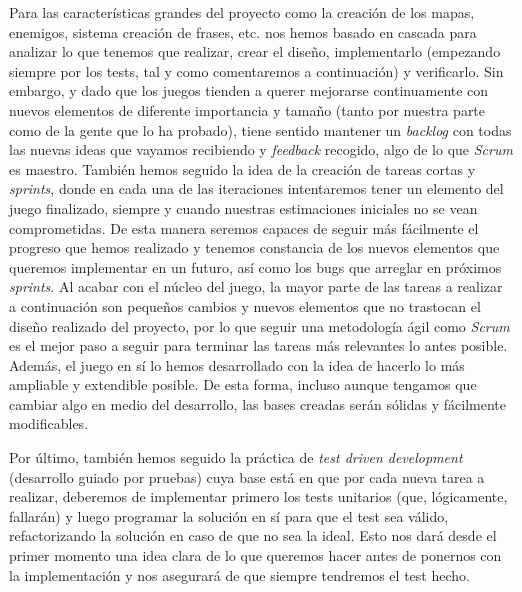 Para las características grandes del proyecto como la creación de los mapas, enemigos, sistema creación de frases, etc. nos hemos basado en cascada para analizar lo que tenemos que realizar, crear el diseño, implementarlo (empezando siempre por los tests, tal y como comentaremos a continuación) y verificarlo. Sin embargo, y dado que los juegos tienden a querer mejorarse continuamente con nuevos elementos de diferente importancia y tamaño (tanto por nuestra parte como de la gente que lo ha probado), tiene sentido mantener un \textit{backlog} con todas las nuevas ideas que vayamos recibiendo y \textit{feedback} recogido, algo de lo que \textit{Scrum} es maestro. 
También hemos seguido la idea de la creación de tareas cortas y \textit{sprints}, donde en cada una de las iteraciones intentaremos tener un elemento del juego finalizado, siempre y cuando nuestras estimaciones iniciales no se vean comprometidas. De esta manera seremos capaces de seguir más fácilmente el progreso que hemos realizado y tenemos constancia de los nuevos elementos que queremos implementar en un futuro, así como los bugs que arreglar en próximos \textit{sprints}.
Al acabar con el núcleo del juego, la mayor parte de las tareas a realizar a continuación son pequeños cambios y nuevos elementos que no trastocan el diseño realizado del proyecto, por lo que seguir una metodología ágil como \textit{Scrum} es el mejor paso a seguir para terminar las tareas más relevantes lo antes posible. Además, el juego en sí lo hemos desarrollado con la idea de hacerlo lo más ampliable y extendible posible. De esta forma, incluso aunque tengamos que cambiar algo en medio del desarrollo, las bases creadas serán sólidas y fácilmente modificables. 

Por último, también hemos seguido la práctica de \textit{test driven development} (desarrollo guiado por pruebas) cuya base está en que por cada nueva tarea a realizar, deberemos de implementar primero los tests unitarios (que, lógicamente, fallarán) y luego programar la solución en sí para que el test sea válido, refactorizando la solución en caso de que no sea la ideal. Esto nos dará desde el primer momento una idea clara de lo que queremos hacer antes de ponernos con la implementación y nos asegurará de que siempre tendremos el test hecho.